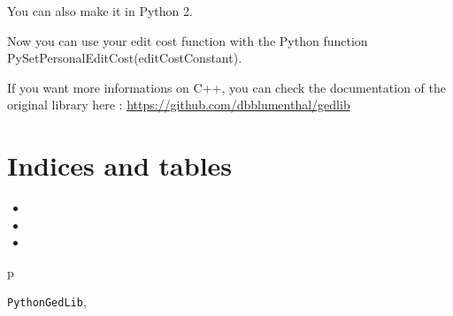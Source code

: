 \documentclass[letterpaper,10pt,english]{sphinxmanual}
\begin{document}
You can also make it in Python 2.

Now you can use your edit cost function with the Python function PySetPersonalEditCost(editCostConstant).

If you want more informations on C++, you can check the documentation of the original library here : \url{https://github.com/dbblumenthal/gedlib}


\chapter{Indices and tables}
\label{index:indices-and-tables}\begin{itemize}
\item {} 

\item {} 

\item {} 

\end{itemize}


\renewcommand{\indexname}{Python Module Index}
\begin{theindex}
\def\bigletter#1{{\Large\sffamily#1}\nopagebreak\vspace{1mm}}
\bigletter{p}
\item {\texttt{PythonGedLib}}, \pageref{doc:module-PythonGedLib}
\end{theindex}

\renewcommand{\indexname}{Index}
\printindex
\end{document}
